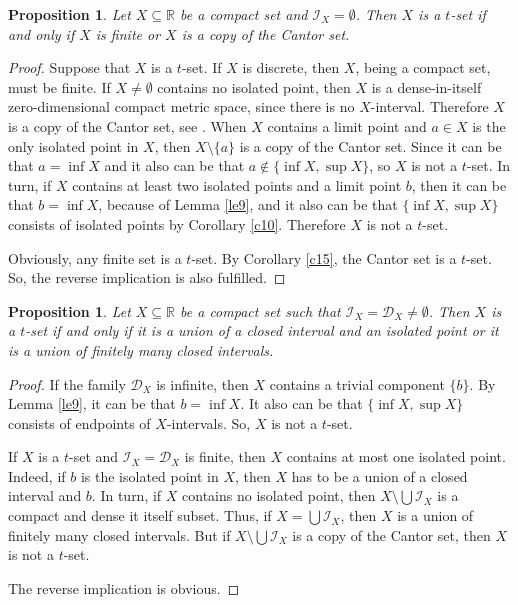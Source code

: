 \documentclass[12pt,a4paper,leqno]{amsart}
\newtheorem{pro}[thm]{Proposition}
\theoremstyle{definition}
\begin{document}
\begin{pro}\label{p16} Let $X\subseteq \mathbb R$ be a compact set and $\mathcal I_X=\emptyset $. Then $X$  is a $ t $-set if and only if $X$ is finite or $X$ is a copy of the Cantor set. 
\end{pro} 
\begin{proof} Suppose that $X$ is a $t$-set. If $X$ is  discrete, then $X$, being a compact set,  must be finite.  If $X\not=\emptyset$ contains no isolated point,   then $X$ is a dense-in-itself zero-dimensional compact metric space, since there is no $X$-interval. Therefore  $X$ is a copy of the Cantor set, see \cite[6.2.A. (c)]{enge}. 
When $X$ contains a limit point and $a\in X$ is the only isolated point  in $X$, then $X\setminus \{a\}$ is   a copy of the Cantor set. Since it can be that $a=\inf X$ and it also  can be that $a\notin \{\inf X, \sup X\}$, so $X$  is not a $ t $-set.
In turn, if $X$ contains at least two isolated points and a limit point $b$, then   it can be that $b=\inf X$, because of  Lemma \ref{le9},  and  it also can be that $ \{\inf X, \sup X\}$ consists of isolated points by  Corollary  \ref{c10}. Therefore   $X$ is not a $ t $-set.

Obviously, any finite set is a $t$-set. By Corollary \ref{c15}, the Cantor set is a $t$-set. So, the reverse implication is also fulfilled. 
\end{proof}


\begin{pro}\label{p17} Let $X\subseteq \mathbb R$ be a compact set  such that $\mathcal I_X=\mathcal D_X \not=\emptyset $. Then $X$ is a $ t $-set if and only if it is a union of a closed interval and an isolated point or it is a union of finitely many closed intervals. 
\end{pro} 
\begin{proof} If the family $\mathcal D_X$ is infinite, then $X$ contains  a trivial component $\{ b\}$.  By Lemma \ref{le9}, it can be that $b=\inf X$.
It also can be that $ \{\inf X, \sup X\}$ consists of endpoints of $X$-intervals.  So, $X$ is not a $ t $-set. 

If $X$ is a $t$-set and  $\mathcal I_X=\mathcal D_X$ is finite, then $X$ contains at most  one isolated point. Indeed, if $b$ is the isolated point in $X$, then $X$ has to be  a union of a closed interval and $b$. In turn, if $X$ contains no isolated point, then $X \setminus \bigcup \mathcal I_X$ is a compact and dense it itself subset. Thus, if $X = \bigcup \mathcal I_X$, then $X$ is a union of finitely many closed intervals. But if $X \setminus \bigcup \mathcal I_X$  is a copy of the Cantor set, then $X$ is not a $ t $-set.

The reverse implication is obvious.\end{proof}
\end{document}
